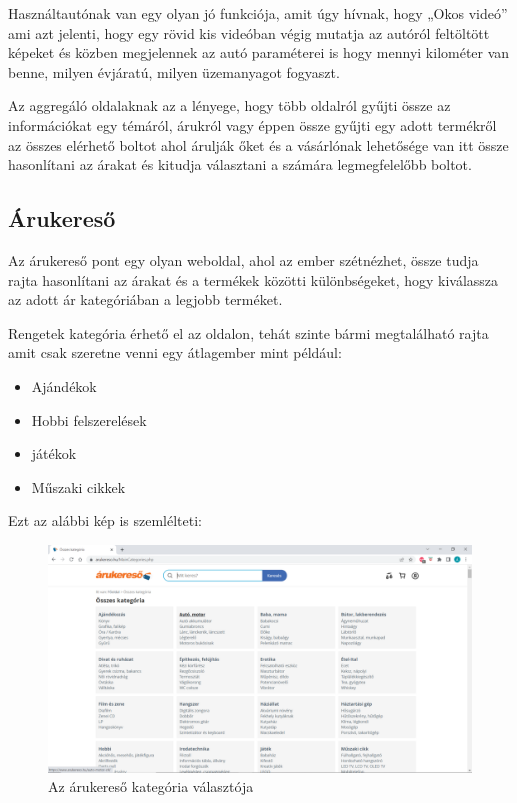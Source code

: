 Használtautónak van egy olyan jó funkciója, amit úgy hívnak, hogy „Okos videó” ami azt jelenti, hogy egy rövid kis videóban végig mutatja az autóról feltöltött képeket és közben megjelennek az autó paraméterei is hogy mennyi kilométer van benne, milyen évjáratú, milyen üzemanyagot fogyaszt. 


Az aggregáló oldalaknak az a lényege, hogy több oldalról gyűjti össze az információkat egy témáról, árukról vagy éppen össze gyűjti egy adott termékről az összes elérhető boltot ahol árulják őket és a vásárlónak lehetősége van itt össze hasonlítani az árakat és kitudja választani a számára legmegfelelőbb boltot.

\subsection{Árukereső}

Az árukereső pont egy olyan weboldal, ahol az ember szétnézhet, össze tudja rajta hasonlítani az árakat és a termékek közötti különbségeket, hogy kiválassza az adott ár kategóriában a legjobb terméket.

Rengetek kategória érhető el az oldalon, tehát szinte bármi megtalálható rajta amit csak szeretne venni egy átlagember mint például:

\begin{itemize}
\item Ajándékok
\item Hobbi felszerelések
\item játékok
\item Műszaki cikkek
\end{itemize}

Ezt az alábbi kép is szemlélteti:

\begin{figure}[h]
\centering
\includegraphics[scale=0.8]{images/arukereso.png}
\caption{Az árukereső kategória választója\cite{Arukereso}}
\label{fig:arukereso}
\end{figure}
\newpage